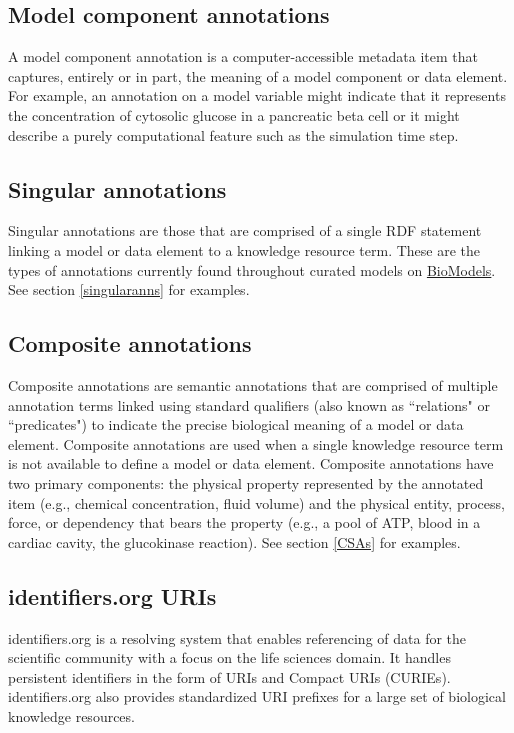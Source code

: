 \documentclass[pdftex,rgb,dvipsnames,svgnames,hyperref,table]{report}
\begin{document}
\subsection{Model component annotations}
A model component annotation is a computer-accessible metadata item that captures, entirely or in part, the meaning of a model component or data element. For example, an annotation on a model variable might indicate that it represents the concentration of cytosolic glucose in a pancreatic beta cell or it might describe a purely computational feature such as the simulation time step.

\subsection{Singular annotations}
Singular annotations are those that are comprised of a single RDF statement linking a model or data element to a knowledge resource term. These are the types of annotations currently found throughout curated models on \href{http://www.ebi.ac.uk/biomodels/}{BioModels}. See section \ref{singularanns} for examples.

\subsection{Composite annotations}
Composite annotations are semantic annotations that are comprised of multiple annotation terms linked using standard qualifiers (also known as ``relations" or ``predicates") to indicate the precise biological meaning of a model or data element. Composite annotations are used when a single knowledge resource term is not available to define a model or data element. Composite annotations have two primary components: the physical property represented by the annotated item (e.g., chemical concentration, fluid volume) and the physical entity, process, force, or dependency that bears the property (e.g., a pool of ATP, blood in a cardiac cavity, the glucokinase reaction). See section \ref{CSAs} for examples.

\subsection{identifiers.org URIs}
identifiers.org \cite{identifiers2018} is a resolving system that enables referencing of data for the scientific community with a focus on the life sciences domain. It handles persistent identifiers in the form of URIs and Compact URIs (CURIEs). identifiers.org also provides standardized URI prefixes for a large set of biological knowledge resources.
\end{document}

